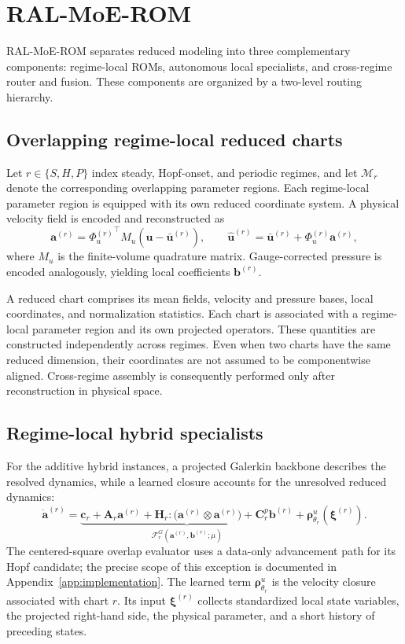 \section{RAL-MoE-ROM}
\label{sec:method}

RAL-MoE-ROM separates reduced modeling into three complementary components: regime-local ROMs, autonomous local specialists, and cross-regime router and fusion. These components are organized by a two-level routing hierarchy. 

\subsection{Overlapping regime-local reduced charts}

Let $r\in\{S,H,P\}$ index steady, Hopf-onset, and periodic regimes, and let $\mathcal M_r$ denote the corresponding overlapping parameter regions. Each regime-local parameter region is equipped with its own reduced coordinate system. A physical velocity field is encoded and reconstructed as
\begin{equation}
  \bm a^{(r)}={\Phi_u^{(r)}}^{\top}M_u(\bm u-\bar{\bm u}^{(r)}),\qquad
  \widehat{\bm u}^{(r)}=\bar{\bm u}^{(r)}+\Phi_u^{(r)}\bm a^{(r)},
  \label{eq:main_chart}
\end{equation}
where $M_u$ is the finite-volume quadrature matrix. Gauge-corrected pressure is encoded analogously, yielding local coefficients
$\bm b^{(r)}$. 

A reduced chart comprises its mean fields, velocity and pressure bases, local coordinates, and normalization statistics. Each chart is associated with a regime-local parameter region and its own projected operators.
These quantities are constructed independently across regimes. Even when two charts have the same reduced dimension, their coordinates are not assumed to be componentwise aligned. Cross-regime assembly is consequently performed only after reconstruction in physical space.

\subsection{Regime-local hybrid specialists}

For the additive hybrid instances, a projected Galerkin backbone describes the resolved dynamics, while a learned closure accounts for the unresolved reduced dynamics:
\begin{equation}
  \dot{\bm a}^{(r)}=
  \underbrace{\bm c_r+\bm A_r\bm a^{(r)}+
  \bm H_r:\bigl(\bm a^{(r)}\otimes\bm a^{(r)}\bigr)+
  \bm C^p_r\bm b^{(r)}}_{\mathcal F_r^{G}(\bm a^{(r)},\bm b^{(r)};\mu)}
  +\bm\rho^u_{\theta_r}(\bm\xi^{(r)}).
  \label{eq:main_specialist}
\end{equation}
The centered-square overlap evaluator uses a data-only advancement path for its Hopf candidate; the precise scope of this exception is documented in Appendix~\ref{app:implementation}. The learned term $\bm\rho^u_{\theta_r}$ is the velocity closure associated with chart $r$. Its input $\bm\xi^{(r)}$ collects standardized local state variables, the projected right-hand side, the physical parameter, and a short history of preceding states.

